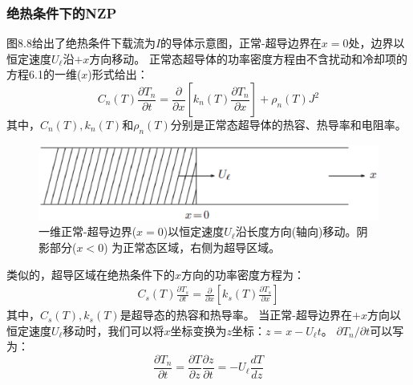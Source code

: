 \subsubsection*{绝热条件下的NZP}
图8.8给出了绝热条件下载流为$I$的导体示意图，正常-超导边界在$x=0$处，边界以恒定速度$U_\ell$沿$+x$方向移动。
正常态超导体的功率密度方程由不含扰动和冷却项的方程6.1的一维($x$)形式给出：
\begin{equation}%
C_n(T)\frac{\partial T_n}{\partial t}=\frac{\partial}{\partial x}\left[k_n(T)\frac{\partial T_n}{\partial x}\right]+\rho_n(T)J^2
\end{equation}
其中，$C_n(T),k_n(T)$和$\rho_n(T)$分别是正常态超导体的热容、热导率和电阻率。

\begin{figure}
	\centering
	\includegraphics[scale=0.6]{chpt8/figs/fig8.8.eps}
	\caption{一维正常-超导边界($x=0$)以恒定速度$U_\ell$沿长度方向(轴向)移动。阴影部分($x<0$)
		为正常态区域，右侧为超导区域。}
\end{figure}

类似的，超导区域在绝热条件下的$x$方向的功率密度方程为：
\begin{align*}%
C_s(T)\frac{\partial T_s}{\partial t}=\frac{\partial}{\partial x}\left[k_s(T)\frac{\partial T_s}{\partial x}\right] \tag{8.41b}
\end{align*}
其中，$C_s(T),k_s(T)$是超导态的热容和热导率。
当正常-超导边界在$+x$方向以恒定速度$U_\ell$移动时，我们可以将$x$坐标变换为$z$坐标：$z=x-U_\ell t$。
$\partial T_n/\partial t$可以写为：
\begin{equation}%
\frac{\partial T_n}{\partial t}=\frac{\partial T}{\partial z}\frac{\partial z}{\partial t}=-U_\ell\frac{dT}{dz}
\end{equation}

